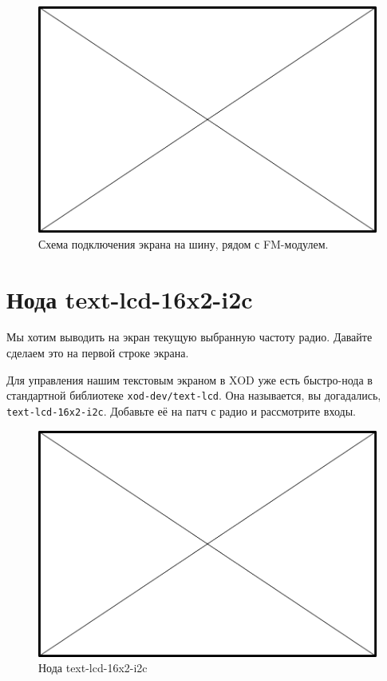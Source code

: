 \begin{figure}
  \centering
  \includegraphics{TODO}
  \caption{Схема подключения экрана на шину, рядом с FM-модулем.}
  \label{fig:text-lcd-radio-wiring}
\end{figure}

\section{Нода text-lcd-16x2-i2c}

Мы хотим выводить на экран текущую выбранную частоту радио. Давайте сделаем это на первой строке экрана.

Для управления нашим текстовым экраном в XOD уже есть быстро-нода в стандартной библиотеке \texttt{xod-dev/text-lcd}. Она называется, вы догадались, \texttt{text-lcd-16x2-i2c}. Добавьте её на патч с радио и рассмотрите входы.

\begin{figure}
  \centering
  \includegraphics{TODO}
  \caption{Нода text-lcd-16x2-i2c}
\end{figure}

